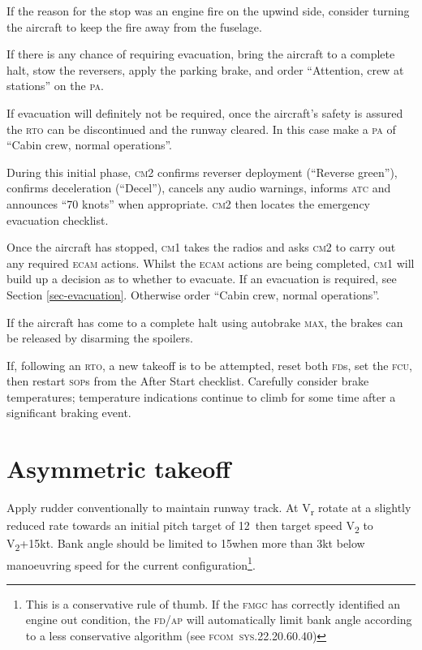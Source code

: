 \documentclass[a5paper,11pt,twoside]{book}
\newcommand{\ac}[1]{{\scshape\MakeLowercase{#1}}}
\newcommand{\cphrase}[1]{\ac{#1}}
\newcommand{\inlcite}[1]{{\ac{#1}}}
\newcommand{\multicite}[1]{%
  \nopagebreak
  \noindent{{\color{blue}\footnotesize[ \inlcite{#1} ]}}
}
\newcommand{\V}[1]{V\textsubscript{#1}}
\begin{document}
If the reason for the stop was an engine fire on the upwind side, consider
turning the aircraft to keep the fire away from the fuselage.

If there is any chance of requiring evacuation, bring the aircraft to a complete
halt, stow the reversers, apply the parking brake, and order ``Attention, crew
at stations'' on the \ac{PA}.

If evacuation will definitely not be required, once the aircraft's safety is
assured the \ac{RTO} can be discontinued and the runway cleared. In this case
make a \ac{PA} of ``Cabin crew, normal operations''.

During this initial phase, \ac{CM2} confirms reverser deployment (``Reverse
green''), confirms deceleration (``Decel''), cancels any audio warnings, informs
\ac{ATC} and announces ``70 knots'' when appropriate. \ac{CM2} then locates the
emergency evacuation checklist.

Once the aircraft has stopped, \ac{CM1} takes the radios and asks \ac{CM2} to
carry out any required \ac{ECAM} actions. Whilst the \ac{ECAM} actions are being
completed, \ac{CM1} will build up a decision as to whether to evacuate. If an
evacuation is required, see Section \ref{sec-evacuation}. Otherwise order
``Cabin crew, normal operations''.

If the aircraft has come to a complete halt using autobrake \cphrase{MAX}, the brakes
can be released by disarming the spoilers.

If, following an \ac{RTO}, a new takeoff is to be attempted, reset both
\ac{FD}s, set the \ac{FCU}, then restart \ac{SOP}s from the After Start
checklist. Carefully consider brake temperatures; temperature indications
continue to climb for some time after a significant braking event.

\multicite{EOMB~3.10, FCTM~PRO.AEP.MISC}


\section{Asymmetric takeoff}

Apply rudder conventionally to maintain runway track. At V\textsubscript{r}
rotate at a slightly reduced rate towards an initial pitch target of
12\textonehalf\textdegree\, then target speed \V{2} to \V{2}+15kt. Bank angle
should be limited to 15\textdegree{ }when more than 3kt below manoeuvring speed
for the current configuration\footnote{This is a conservative rule of thumb. If
the \ac{FMGC} has correctly identified an engine out condition, the \ac{FD/AP}
will automatically limit bank angle according to a less conservative algorithm
(see \inlcite{FCOM~SYS.22.20.60.40})}.
\end{document}
